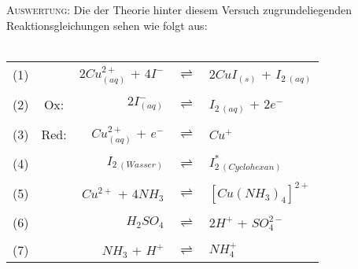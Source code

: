 \documentclass[12pt, a4paper]{article}
\begin{document}
\textsc{Auswertung:}\hspace{8mm} 	Die der Theorie hinter diesem Versuch zugrundeliegenden Reaktionsgleichungen sehen wie folgt aus:\\
\vspace{-10mm}\\
\begin{center}
\begin{tabular}{lcrcl}
(1)& & $\displaystyle{2Cu_{(aq)}^{2+}}$ + $4I^-$ & $\rightleftharpoons$ & $2CuI_{(s)}$ + $I_{2\ (aq)}$\\
\vspace{-3mm}\\
(2)& Ox: & $2I^-_{(aq)}$ & $\rightleftharpoons$ & $I_{2\ (aq)}$ + $ 2e^-$\\
\vspace{-3mm}\\
(3)& Red: & $Cu_{(aq)}^{2+}$ + $e^-$ & $\rightleftharpoons$ & $Cu^+$\\
\vspace{-3mm}\\
(4)& & $I_{2\ (Wasser)}$ & $\rightleftharpoons$ & $I_{2\ (Cyclohexan)}^*$\\
\vspace{-3mm}\\
(5)& & $Cu^{2+}$ + $4NH_3$ & $\rightleftharpoons$ & $\displaystyle{\left[Cu(NH_3)_4\right]^{2+}}$\\
\vspace{-3mm}\\
(6)& & $H_2SO_4$ & $\rightleftharpoons$ & $2H^+$ + $SO_4^{2-}$\\
\vspace{-3mm}\\
(7)& & $NH_3$ + $H^+$ & $\rightleftharpoons$ & $NH_4^+$\\
\end{tabular}
\end{center}
\end{document}
